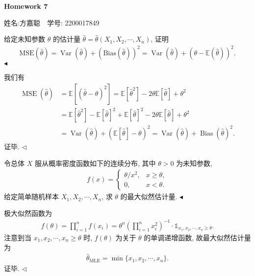 \documentclass[11pt]{article}
\newenvironment{problem}[2][Problem]{\begin{trivlist}
    \item[\hskip \labelsep {\bfseries #1}\hskip \labelsep {\bfseries #2.}]\songti}{\hfill$\blacktriangleleft$\end{trivlist}}
\newenvironment{answer}[1][Solution]{\begin{trivlist}
    \item[\hskip \labelsep {\bfseries #1.}\hskip \labelsep]}{\hfill$\lhd$\end{trivlist}}
\newcommand\1{\mathds{1}}
\newcommand\E{\mathbb{E}}
\DeclareMathOperator{\Var}{Var}
\DeclareMathOperator{\MSE}{MSE}
\DeclareMathOperator{\Bias}{Bias}
\begin{document}
\kaishu

\pagestyle{fancy}
\chead{}
\fancyfoot[R]{} 
\fancyfoot[C]{\thepage\ /\ \pageref{LastPage} \\ \textcolor{lightgray}{最后编译时间: \today}}


\begin{center}
    {\LARGE \bf Homework 7}

    {姓名:方嘉聪\ \  学号: 2200017849}            %
\end{center}

\begin{problem}{1}
    给定未知参数 $\theta$ 的估计量 $\hat{\theta} = \hat{\theta}(X_1, X_2, \cdots, X_n)$, 证明
    \begin{align*}
        \mathrm{MSE}(\hat{\theta}) = \Var(\hat{\theta}) + \left(\mathrm{Bias}(\hat{\theta})\right)^2 = \Var(\hat{\theta}) + \left(\theta - \E(\hat{\theta})\right)^2.
    \end{align*}
\end{problem}
\begin{answer}
我们有
\begin{align*}
    \MSE(\hat{\theta}) &= \E\left[(\hat{\theta} - \theta)^2\right] = \E\left[\hat{\theta}^2\right] - 2\theta\E[\hat{\theta}] + \theta^2 \\
    &= \E\left[\hat{\theta}^2\right] - \E[\hat{\theta}]^2 + \E[\hat{\theta}]^2 - 2\theta\E[\hat{\theta}] + \theta^2 \\
    &= \Var(\hat{\theta}) + \left(\E[\hat{\theta}] - \theta\right)^2 = \Var(\hat{\theta}) + \Bias(\hat{\theta})^2.
\end{align*}
证毕.
\end{answer}

\begin{problem}{2}
    令总体 $X$ 服从概率密度函数如下的连续分布, 其中 $\theta >0$ 为未知参数,
    \begin{align*}
        f(x) = \begin{cases}
            \theta/x^2, & x \geq \theta,\\
            0, & x < \theta.
        \end{cases} 
    \end{align*}
    给定简单随机样本 $X_1, X_2, \cdots, X_n$, 求 $\theta$ 的最大似然估计量.
\end{problem}
\begin{answer}
    极大似然函数为
    \begin{align*}
        f(\theta) = \prod_{i=1}^{n} f(x_i) = \theta^n \left(\prod_{i=1}^{n} x_i^2\right)^{-1} \cdot \1_{x_1, x_2, \cdots, x_n \ge \theta}.
    \end{align*}
    注意到当 $x_1, x_2, \cdots, x_n \ge \theta$ 时, $f(\theta)$ 为关于 $\theta$ 的单调递增函数, 故最大似然估计量为 
    \begin{align*}
        \hat{\theta}_{\mathrm{MLE}} = \min\{x_1, x_2, \cdots, x_n\}.
    \end{align*}
    证毕.
\end{answer}
\end{document}
